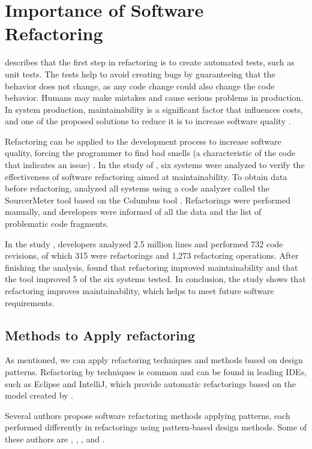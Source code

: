 \section{Importance of Software Refactoring}
\label{sec-importance}
\textcite{fowler2018refactoring} describes that the first step in refactoring is to create automated tests, such as unit tests. The tests help to avoid creating bugs by guaranteeing that the behavior does not change, as any code change could also change the code behavior. Humans may make mistakes and cause serious problems in production. In system production, maintainability is a significant factor that influences costs, and one of the proposed solutions to reduce it is to increase software quality \cite{mens2004}. 

Refactoring can be applied to the development process to increase software quality, forcing the programmer to find bad smells (a characteristic of the code that indicates an issue) \cite{Wilking2007}. 
In the study of \textcite{szHoke2017empirical}, six systems were analyzed to verify the effectiveness of software refactoring aimed at maintainability. To obtain data before refactoring, \textcite{szHoke2017empirical} analyzed all systems using a code analyzer called the SourcerMeter tool based on the Columbus tool \cite{ferenc2002}. Refactorings were performed manually, and developers were informed of all the data and the list of problematic code fragments. 

In the study \textcite{szHoke2017empirical}, developers analyzed 2.5 million lines and performed 732 code revisions, of which 315 were refactorings and 1,273 refactoring operations. After finishing the analysis, \textcite{szHoke2017empirical} found that refactoring improved maintainability and that the tool improved 5 of the six systems tested. In conclusion, the study shows that refactoring improves maintainability, which helps to meet future software requirements.

\subsection{Methods to Apply refactoring}
\label{sub-methods}
As mentioned, we can apply refactoring techniques and methods based on design patterns. Refactoring by techniques is common and can be found in leading IDEs, such as Eclipse and IntelliJ, which provide automatic refactorings based on the model created by \textcite{fowler2018refactoring}. 

Several authors propose software refactoring methods applying patterns, each performed differently in refactorings using pattern-based design methods. Some of these authors are \textcite{Liu2014}, \textcite{zafeiris2017automated}, \textcite{cinneide2000automated}, and \cite{ouni2017more}. 

